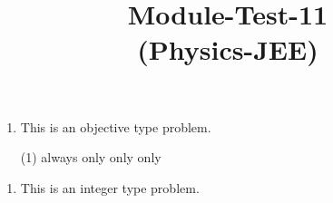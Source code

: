 \documentclass{article}
\title{Module-Test-11\\(Physics-JEE)}
\begin{document}
\maketitle

\jeeSectionA
\begin{enumerate}
\item This is an objective type problem.
    \begin{tasks}(1)
        \task always\ans
        \task only 
        \task only 
        \task only 
    \end{tasks}
\end{enumerate}



\jeeSectionB
\begin{enumerate}\addtocounter{enumi}{20}
\item This is an integer type problem. 
\end{enumerate}
\end{document}
